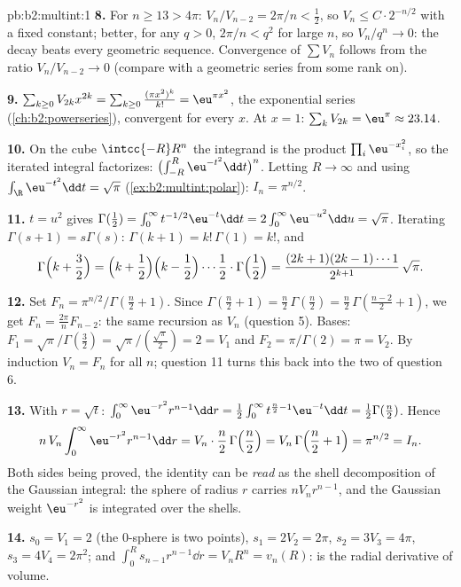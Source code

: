 \begin{solution}{pb:b2:multint:1}
\textbf{8.} For $n \geq 13 > 4\pi$: $V_n/V_{n-2} = 2\pi/n <
\tfrac12$, so $V_{n} \leq C\cdot 2^{-n/2}$ with a fixed
constant; better, for any $q > 0$, $2\pi/n < q^2$ for large
$n$, so $V_n/q^n \to 0$: the decay beats every geometric
sequence. Convergence of $\sum V_n$ follows from the ratio
$V_n/V_{n-2} \to 0$ (compare with a geometric series from
some rank on).

\textbf{9.} $\sum_{k\geq0}V_{2k}x^{2k} =
\sum_{k\geq0}\frac{(\pi x^2)^k}{k!} = \eu^{\pi x^2}$, the
exponential series (\cref{ch:b2:powerseries}), convergent for
every $x$. At $x = 1$: $\sum_kV_{2k} = \eu^\pi \approx
23.14$.

\textbf{10.} On the cube $\intcc{-R}R^n$ the integrand is the
product $\prod_i\eu^{-x_i^2}$, so the iterated integral
factorizes: $\bigl(\int_{-R}^R\eu^{-t^2}\dd t\bigr)^n$.
Letting $R \to \infty$ and using
$\int_\R\eu^{-t^2}\dd t = \sqrt\pi$
(\cref{ex:b2:multint:polar}): $I_n = \pi^{n/2}$.

\textbf{11.} $t = u^2$ gives $\Gamma(\tfrac12) =
\int_0^\infty t^{-1/2}\eu^{-t}\dd t =
2\int_0^\infty\eu^{-u^2}\dd u = \sqrt\pi$. Iterating
$\Gamma(s+1) = s\Gamma(s)$: $\Gamma(k+1) = k!\,\Gamma(1) =
k!$, and
\[
\Gamma\Bigl(k + \frac32\Bigr)
= \Bigl(k + \frac12\Bigr)\Bigl(k - \frac12\Bigr)\cdots
\frac12\cdot\Gamma\Bigl(\frac12\Bigr)
= \frac{(2k+1)(2k-1)\cdots1}{2^{k+1}}\,\sqrt\pi .
\]

\textbf{12.} Set $F_n = \pi^{n/2}/\Gamma(\frac n2 + 1)$.
Since $\Gamma(\frac n2 + 1) = \frac n2\,\Gamma(\frac n2) =
\frac n2\,\Gamma(\frac{n-2}2 + 1)$, we get $F_n =
\frac{2\pi}nF_{n-2}$: the same recursion as $V_n$ (question
5). Bases: $F_1 = \sqrt\pi/\Gamma(\frac32) =
\sqrt\pi/(\frac{\sqrt\pi}2) = 2 = V_1$ and $F_2 =
\pi/\Gamma(2) = \pi = V_2$. By induction $V_n = F_n$ for all
$n$; question 11 turns this back into the two  of
question 6.

\textbf{13.} With $r = \sqrt t$: $\int_0^\infty
\eu^{-r^2}r^{n-1}\dd r = \frac12\int_0^\infty
t^{\frac n2 - 1}\eu^{-t}\dd t = \frac12\Gamma(\frac n2)$.
Hence
\[
n\,V_n\int_0^\infty\eu^{-r^2}r^{n-1}\dd r
= V_n\cdot\frac n2\,\Gamma\Bigl(\frac n2\Bigr)
= V_n\,\Gamma\Bigl(\frac n2 + 1\Bigr) = \pi^{n/2} = I_n .
\]
Both sides being proved, the identity can be \emph{read} as
the shell decomposition of the Gaussian integral: the sphere
of radius $r$ carries  $nV_nr^{n-1}$, and the Gaussian
weight $\eu^{-r^2}$ is integrated over the shells.

\textbf{14.} $s_0 = V_1 = 2$ (the $0$-sphere is two points),
$s_1 = 2V_2 = 2\pi$, $s_2 = 3V_3 = 4\pi$, $s_3 = 4V_4 =
2\pi^2$; and $\int_0^R s_{n-1}r^{n-1}\dd r = V_nR^n =
v_n(R)$:  is the radial derivative of volume.


\end{solution}
